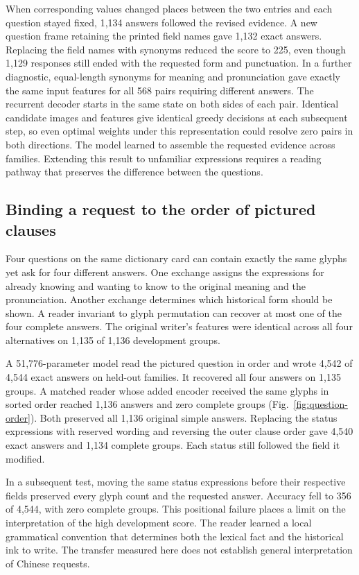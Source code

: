 \documentclass[12pt,a4paper]{article}
\providecommand{\DIFadd}[1]{{\protect\color{blue} \sf #1}} %
\begin{document}
\DIFadd{When corresponding values changed places between the two entries and each question stayed fixed, 1,134 answers followed the revised evidence. A new question frame retaining the printed field names gave 1,132 exact answers. Replacing the field names with synonyms reduced the score to 225, even though 1,129 responses still ended with the requested form and punctuation. In a further diagnostic, equal-length synonyms for meaning and pronunciation gave exactly the same input features for all 568 pairs requiring different answers. The recurrent decoder starts in the same state on both sides of each pair. Identical candidate images and features give identical greedy decisions at each subsequent step, so even optimal weights under this representation could resolve zero pairs in both directions. The model learned to assemble the requested evidence across families. Extending this result to unfamiliar expressions requires a reading pathway that preserves the difference between the questions.
}

\subsection*{\DIFadd{Binding a request to the order of pictured clauses}}
\DIFadd{Four questions on the same dictionary card can contain exactly the same glyphs yet ask for four different answers. One exchange assigns the expressions for already knowing and wanting to know to the original meaning and the pronunciation. Another exchange determines which historical form should be shown. A reader invariant to glyph permutation can recover at most one of the four complete answers. The original writer's features were identical across all four alternatives on 1,135 of 1,136 development groups.
}

\DIFadd{A 51,776-parameter model read the pictured question in order and wrote 4,542 of 4,544 exact answers on held-out families. It recovered all four answers on 1,135 groups. A matched reader whose added encoder received the same glyphs in sorted order reached 1,136 answers and zero complete groups (Fig.~\ref{fig:question-order}). Both preserved all 1,136 original simple answers. Replacing the status expressions with reserved wording and reversing the outer clause order gave 4,540 exact answers and 1,134 complete groups. Each status still followed the field it modified.
}

\DIFadd{In a subsequent test, moving the same status expressions before their respective fields preserved every glyph count and the requested answer. Accuracy fell to 356 of 4,544, with zero complete groups. This positional failure places a limit on the interpretation of the high development score. The reader learned a local grammatical convention that determines both the lexical fact and the historical ink to write. The transfer measured here does not establish general interpretation of Chinese requests.
}
\end{document}
